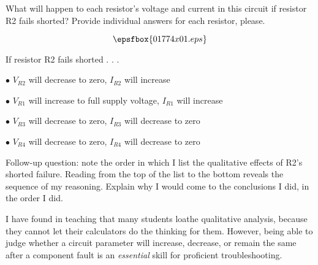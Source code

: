

What will happen to each resistor's voltage and current in this circuit if resistor R2 fails shorted?  Provide individual answers for each resistor, please.

$$\epsfbox{01774x01.eps}$$







If resistor R2 fails shorted . . .

\medskip
\item{$\bullet$} $V_{R2}$ will decrease to zero, $I_{R2}$ will increase
\item{$\bullet$} $V_{R1}$ will increase to full supply voltage, $I_{R1}$ will increase
\item{$\bullet$} $V_{R3}$ will decrease to zero, $I_{R3}$ will decrease to zero
\item{$\bullet$} $V_{R4}$ will decrease to zero, $I_{R4}$ will decrease to zero
\medskip

\vskip 10pt

Follow-up question: note the order in which I list the qualitative effects of R2's shorted failure.  Reading from the top of the list to the bottom reveals the sequence of my reasoning.  Explain why I would come to the conclusions I did, in the order I did.







I have found in teaching that many students loathe qualitative analysis, because they cannot let their calculators do the thinking for them.  However, being able to judge whether a circuit parameter will increase, decrease, or remain the same after a component fault is an {\it essential} skill for proficient troubleshooting.




